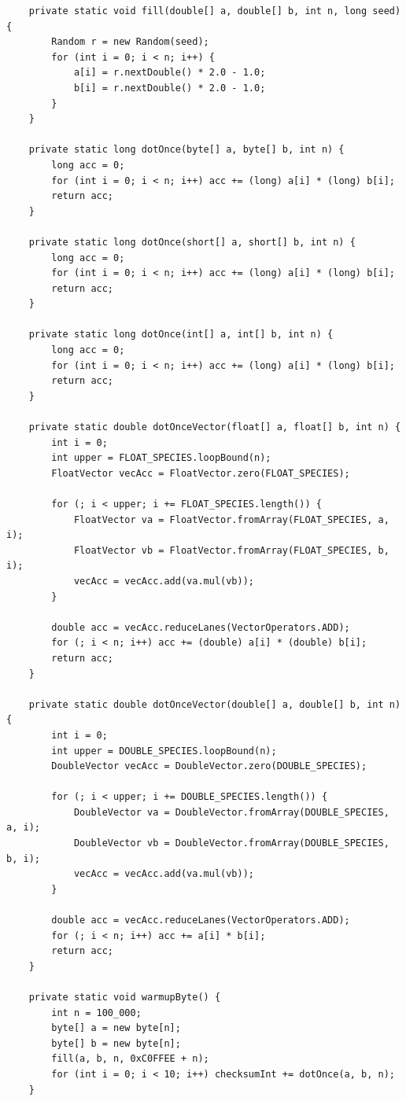 \documentclass[12pt,fontset=none]{ctexart}
\begin{document}
\begin{verbatim}
    private static void fill(double[] a, double[] b, int n, long seed) {
        Random r = new Random(seed);
        for (int i = 0; i < n; i++) {
            a[i] = r.nextDouble() * 2.0 - 1.0;
            b[i] = r.nextDouble() * 2.0 - 1.0;
        }
    }

    private static long dotOnce(byte[] a, byte[] b, int n) {
        long acc = 0;
        for (int i = 0; i < n; i++) acc += (long) a[i] * (long) b[i];
        return acc;
    }

    private static long dotOnce(short[] a, short[] b, int n) {
        long acc = 0;
        for (int i = 0; i < n; i++) acc += (long) a[i] * (long) b[i];
        return acc;
    }

    private static long dotOnce(int[] a, int[] b, int n) {
        long acc = 0;
        for (int i = 0; i < n; i++) acc += (long) a[i] * (long) b[i];
        return acc;
    }

    private static double dotOnceVector(float[] a, float[] b, int n) {
        int i = 0;
        int upper = FLOAT_SPECIES.loopBound(n);
        FloatVector vecAcc = FloatVector.zero(FLOAT_SPECIES);

        for (; i < upper; i += FLOAT_SPECIES.length()) {
            FloatVector va = FloatVector.fromArray(FLOAT_SPECIES, a, i);
            FloatVector vb = FloatVector.fromArray(FLOAT_SPECIES, b, i);
            vecAcc = vecAcc.add(va.mul(vb));
        }

        double acc = vecAcc.reduceLanes(VectorOperators.ADD);
        for (; i < n; i++) acc += (double) a[i] * (double) b[i];
        return acc;
    }

    private static double dotOnceVector(double[] a, double[] b, int n) {
        int i = 0;
        int upper = DOUBLE_SPECIES.loopBound(n);
        DoubleVector vecAcc = DoubleVector.zero(DOUBLE_SPECIES);

        for (; i < upper; i += DOUBLE_SPECIES.length()) {
            DoubleVector va = DoubleVector.fromArray(DOUBLE_SPECIES, a, i);
            DoubleVector vb = DoubleVector.fromArray(DOUBLE_SPECIES, b, i);
            vecAcc = vecAcc.add(va.mul(vb));
        }

        double acc = vecAcc.reduceLanes(VectorOperators.ADD);
        for (; i < n; i++) acc += a[i] * b[i];
        return acc;
    }

    private static void warmupByte() {
        int n = 100_000;
        byte[] a = new byte[n];
        byte[] b = new byte[n];
        fill(a, b, n, 0xC0FFEE + n);
        for (int i = 0; i < 10; i++) checksumInt += dotOnce(a, b, n);
    }


\end{verbatim}
\end{document}
